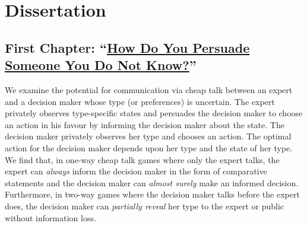 \documentclass[letterpaper,11pt]{article}
\renewenvironment{itemize}{
\begin{list}{}{
\setlength{\leftmargin}{1.5em}
}
}{
\end{list}
}
\begin{document}
%
%

\newpage

\section*{Dissertation}
\subsection*{First Chapter: ``\href{http://works.bepress.com/yi/1}{\color{blue}How Do You Persuade Someone You Do Not Know?}''}
\begin{itemize}
\item \begin{spacing}{1.0} We examine the potential for communication via cheap talk between an expert and a decision maker whose type (or preferences) is uncertain. The expert privately observes type-specific states and persuades the decision maker to choose an action in his favour by informing the decision maker about the state. The decision maker privately observes her type and chooses an action. The optimal action for the decision maker depends upon her type and the state of her type. We find that, in one-way cheap talk games where only the expert talks, the expert can \emph{always} inform the decision maker in the form of comparative statements and the decision maker can \emph{almost surely} make an informed decision. Furthermore, in two-way games where the decision maker talks before the expert does, the decision maker can \emph{partially reveal} her type to the expert or public without information loss. \end{spacing}
\end{itemize}
\end{document}
